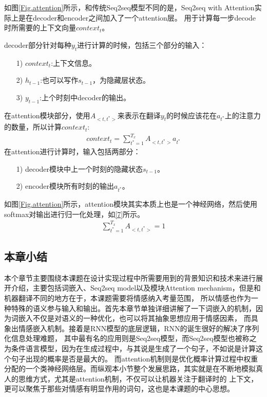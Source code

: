 \documentclass[supercite]{HustGraduPaper}
\theoremstyle{definition}
\begin{document}
如图\ref{Fig.attention}所示，和传统Seq2seq模型不同的是，Seq2seq with Attention实际上是在decoder和encoder之间加入了一个attention层。
用于计算每一步decode时所需要的上下文向量$context_t$。

decoder部分针对每种$y_t$进行计算的时候，包括三个部分的输入：
\begin{itemize}
  \item [1)]$context_t$:上下文信息。
  \item [2)]$h_{t-1}$:也可以写作$s_{t-1}$，为隐藏层状态。
  \item [3)]$y_{t-1}$:上个时刻中decoder的输出。
\end{itemize}

在attention模块部分，使用$A_{<t,t^*>}$来表示在翻译$y_{t}$的时候应该花在$a_{t^*}$上的注意力的数量，所以计算$context_{t}$:
\begin{align}
  context_{t} = \sum_{t^*=1}^{T_x}{A_{<t,t^{*}>}}a_{t^*} \label{6}
\end{align}
在attention进行计算时，输入包括两部分：
\begin{enumerate}
  \item [1)]decoder模块中上一个时刻的隐藏状态$s_{t-1}$。
  \item [2)]encoder模块所有时刻的输出$a_{t^*}$。
\end{enumerate}

如图\ref{Fig.attention}所示，attention模块其实本质上也是一个神经网络，然后使用softmax对输出进行归一化处理，如\ref{7}所示。
\begin{align}
  \sum_{t^*=1}^{T_x}{A_{<t,t^{*}>}}=1 \label{7}
\end{align}

\subsection{本章小结}
本个章节主要围绕本课题在设计实现过程中所需要用到的背景知识和技术来进行展开介绍，主要包括词嵌入、Seq2seq model以及模块Attention mechanism，但是和机器翻译不同的地方在于，本课题需要将情感纳入考量范围，
所以情感也作为一种特殊的语义参与输入和输出。首先本章节单独详细讲解了一下词嵌入的机制，因为词嵌入不仅是对语义的一种优化，也可以将其抽象思想应用于情感因素，
而具象出情感嵌入机制。接着是RNN模型的底层逻辑，RNN的诞生很好的解决了序列化信息处理难题，
其中最有名的应用则是Seq2seq模型，而Seq2seq模型也被称之为条件语言模型，因为在生成过程中，与其说是生成了一个句子，不如说是计算这个句子出现的概率是否是最大的。
而attention机制则是优化概率计算过程中权重分配的一个类神经网络层。而纵观本小节整个发展思路，其实就是在不断地模拟真人的思维方式，尤其是attention机制，不仅可以让机器关注于翻译时的
上下文，更可以聚焦于那些对情感有明显作用的词句，这也是本课题的中心思想。
\end{document}
